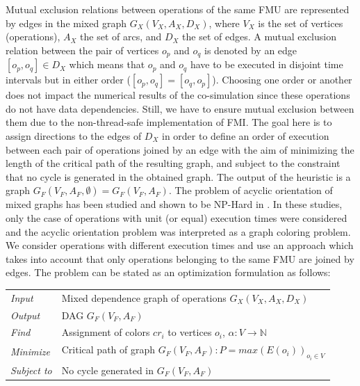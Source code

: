 Mutual exclusion relations between operations of the same  FMU are represented by edges in the mixed graph $G_X(V_X,A_X,D_X)$, where $V_X$ is the set of vertices (operations), $A_X$ the set of arcs, and $D_X$ the set of edges. A mutual exclusion relation between the pair of vertices $o_p$ and $o_q$ is denoted by an edge $[o_p,o_q] \in D_X$ which means that $o_p$ and $o_q$ have to be executed in disjoint time intervals but in either order ($[o_p,o_q]=[o_q,o_p]$). Choosing one order or another does not impact the numerical results of the co-simulation since these operations do not have data dependencies. Still, we have to ensure mutual exclusion between them due to the non-thread-safe implementation of FMI. The goal here is to assign directions to the edges of $D_X$ in order to define an order of execution between each pair of operations joined by an edge with the aim of minimizing the length of the critical path of the resulting graph, and subject to the constraint that no cycle is generated in the obtained graph. The output of the heuristic is a graph $G_F(V_F,A_F,\emptyset) = G_F(V_F,A_F)$. The problem of acyclic orientation of mixed graphs has been studied and shown to be NP-Hard in \cite{andreev:2000,sotskov:2002,al-anzi:2006}. In these studies, only the case of operations with unit (or equal) execution times were considered and the acyclic orientation problem was interpreted as a graph coloring problem. We consider operations with different execution times and use an approach which takes into account that only operations belonging to the same FMU are joined by edges. The problem can be stated as an optimization formulation as follows:

\begin{table}[h]
\centering
\begin{tabular}{l  l}
	
  \textit{Input} & Mixed dependence graph of operations $G_X(V_X,A_X,D_X)$\\
	\rule{0pt}{5ex}									  
	
  \textit{Output} & DAG $G_F(V_F,A_F)$\\
	\rule{0pt}{5ex}									  
  
	\textit{Find} & Assignment of colors $cr_i$ to vertices $o_i$, $\alpha: V \rightarrow \mathbb{N}$\\
	\rule{0pt}{5ex}									 
	
	\textit{Minimize} & Critical path of graph $G_F(V_F,A_F): P = max(E(o_i))_{o_i \in V}$\\
	\rule{0pt}{5ex}									 
	
	\textit{Subject to} & No cycle generated in $G_F(V_F,A_F)$\\
										 
	
\end{tabular}
\end{table}



